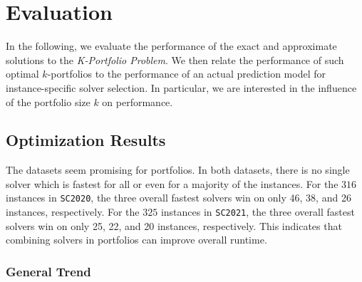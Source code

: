 \documentclass[conference]{IEEEtran}
\begin{document}
\section{Evaluation}
\label{sec:evaluation}

In the following, we evaluate the performance of the exact and approximate solutions to the \emph{K-Portfolio Problem}. 
We then relate the performance of such optimal $k$-portfolios to the performance of an actual prediction model for instance-specific solver selection. 
In particular, we are interested in the influence of the portfolio size $k$ on performance. 

\subsection{Optimization Results}

The datasets seem promising for portfolios. %
In both datasets, there is no single solver which is fastest for all or even for a majority of the instances.
For the $316$ instances in \texttt{SC2020}, the three overall fastest solvers win on only 46, 38, and 26 instances, respectively.
For the $325$ instances in \texttt{SC2021}, the three overall fastest solvers win on only 25, 22, and 20 instances, respectively.
This indicates that combining solvers in portfolios can improve overall runtime.

\subsubsection{General Trend}
\end{document}
